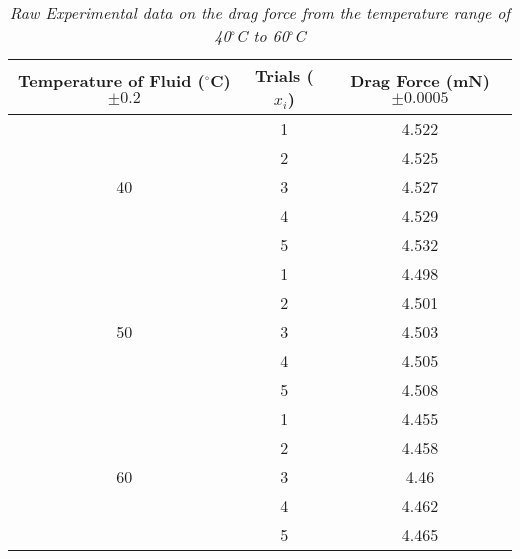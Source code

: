 \begin{table}[H]
  \centering
  \caption{\textit{Raw Experimental data on the drag force from the temperature range of 40$^\circ$C to 60$^\circ$C}}
    \begin{tabular}{ccc}
    \toprule
    Temperature of Fluid ($^\circ$C) $\pm 0.2$ & Trials ($x_i$) & Drag Force (mN) $\pm 0.0005$ \\
    \midrule
    \multirow{5}[10]{*}{40} & 1     & 4.522 \\
\cmidrule{2-3}          & 2     & 4.525 \\
\cmidrule{2-3}          & 3     & 4.527 \\
\cmidrule{2-3}          & 4     & 4.529 \\
\cmidrule{2-3}          & 5     & 4.532 \\
    \midrule
    \multirow{5}[10]{*}{50} & 1     & 4.498 \\
\cmidrule{2-3}          & 2     & 4.501 \\
\cmidrule{2-3}          & 3     & 4.503 \\
\cmidrule{2-3}          & 4     & 4.505 \\
\cmidrule{2-3}          & 5     & 4.508 \\
    \midrule
    \multirow{5}[10]{*}{60} & 1     & 4.455 \\
\cmidrule{2-3}          & 2     & 4.458 \\
\cmidrule{2-3}          & 3     & 4.46 \\
\cmidrule{2-3}          & 4     & 4.462 \\
\cmidrule{2-3}          & 5     & 4.465 \\
    \bottomrule
    \end{tabular}%
  \label{tab:addlabel}%
\end{table}%

